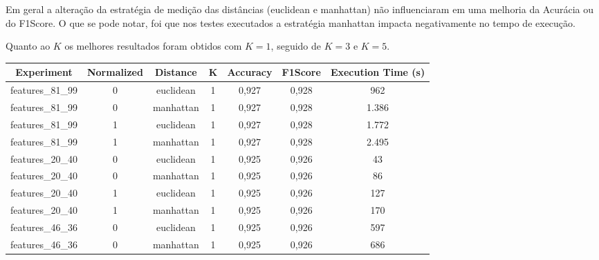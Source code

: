 \documentclass[9pt,twocolumn]{article}
\begin{document}
Em geral a alteração da estratégia de medição das distâncias (euclidean e manhattan) não influenciaram em uma melhoria da Acurácia ou do F1Score. O que se pode notar, foi que nos testes executados a estratégia manhattan impacta negativamente no tempo de execução.

Quanto ao $K$ os melhores resultados foram obtidos com $K=1$, seguido de $K=3$ e $K=5$.

\begin{table}[t]
  \centering
  \begin{tabular}{|c|c|c|c|c|c|c|}
  \hline
  \textbf{Experiment} & \textbf{Normalized} & \textbf{Distance} & \textbf{K} & \textbf{Accuracy} & \textbf{F1Score} & \textbf{Execution Time (s)} \\ \hline
  features\_81\_99    & 0                   & euclidean         & 1          & 0,927             & 0,928            & 962                     \\ \hline
  features\_81\_99    & 0                   & manhattan         & 1          & 0,927             & 0,928            & 1.386                   \\ \hline
  features\_81\_99    & 1                   & euclidean         & 1          & 0,927             & 0,928            & 1.772                   \\ \hline
  features\_81\_99    & 1                   & manhattan         & 1          & 0,927             & 0,928            & 2.495                   \\ \hline
  features\_20\_40    & 0                   & euclidean         & 1          & 0,925             & 0,926            & 43                      \\ \hline
  features\_20\_40    & 0                   & manhattan         & 1          & 0,925             & 0,926            & 86                      \\ \hline
  features\_20\_40    & 1                   & euclidean         & 1          & 0,925             & 0,926            & 127                     \\ \hline
  features\_20\_40    & 1                   & manhattan         & 1          & 0,925             & 0,926            & 170                     \\ \hline
  features\_46\_36    & 0                   & euclidean         & 1          & 0,925             & 0,926            & 597                     \\ \hline
  features\_46\_36    & 0                   & manhattan         & 1          & 0,925             & 0,926            & 686                     \\ \hline

\end{tabular}
\end{table}
\end{document}
